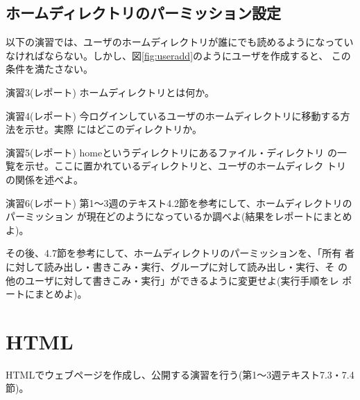 \documentclass[a4j,10pt]{jarticle}
\begin{document}
\subsection{ホームディレクトリのパーミッション設定}
以下の演習では、ユーザのホームディレクトリが誰にでも読めるようになってい
なければならない。しかし、図\ref{fig:useradd}のようにユーザを作成すると、
この条件を満たさない。
\begin{itembox}{演習3(レポート)}
 ホームディレクトリとは何か。
\end{itembox}
\begin{itembox}{演習4(レポート)}
 今ログインしているユーザのホームディレクトリに移動する方法を示せ。実際
 にはどこのディレクトリか。
\end{itembox}
\begin{itembox}{演習5(レポート)}
 {\sffamily {\slash}home}というディレクトリにあるファイル・ディレクトリ
 の一覧を示せ。ここに置かれているディレクトリと、ユーザのホームディレク
 トリの関係を述べよ。
\end{itembox}
\begin{itembox}{演習6(レポート)}
 第1〜3週のテキスト4.2節を参考にして、ホームディレクトリのパーミッション
 が現在どのようになっているか調べよ(結果をレポートにまとめよ)。

 その後、4.7節を参考にして、ホームディレクトリのパーミッションを、「所有
 者に対して読み出し・書きこみ・実行、グループに対して読み出し・実行、そ
 の他のユーザに対して書きこみ・実行」ができるように変更せよ(実行手順をレ
 ポートにまとめよ)。
\end{itembox}

\section{HTML}
HTMLでウェブページを作成し、公開する演習を行う(第1〜3週テキスト7.3・7.4
節)。
\end{document}
